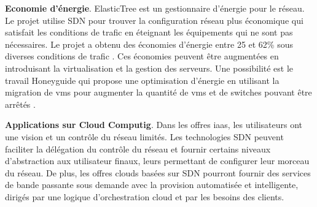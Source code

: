 
\textbf{Economie d'énergie}. ElasticTree est un gestionnaire d'énergie pour le réseau. Le projet utilise SDN pour trouver la configuration réseau plus économique qui satisfait les conditions de trafic en éteignant les équipements qui ne sont pas nécessaires. Le projet a obtenu des économies d'énergie entre 25 et 62\% sous diverses conditions de trafic \cite{Elastictree}. Ces économies peuvent être augmentées en introduisant la virtualisation et la gestion des serveurs. Une possibilité est le travail Honeyguide qui propose une optimisation d'énergie en utilisant la migration de \glspl{vm} pour augmenter la quantité de \glspl{vm} et de switches pouvant être arrêtés \cite{Honeyguide}.




\textbf{Applications sur Cloud Computig}. Dans les offres \gls{iaas}, les utilisateurs ont une vision et un contrôle du réseau  limités. Les technologies SDN peuvent faciliter la délégation du contrôle du réseau et fournir certains niveaux d'abstraction aux utilisateur finaux, leurs permettant de configurer leur morceau du réseau. De plus, les offres clouds basées sur SDN pourront fournir des services de bande passante sous demande avec la provision automatisée et intelligente, dirigés par une logique d'orchestration cloud et par les besoins des clients. \cite{AdoptionResearchTrendsCloud}

